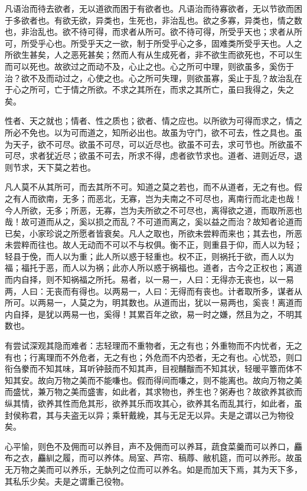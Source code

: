 \documentclass[]{article}
\begin{document}
凡语治而待去欲者，无以道欲而困于有欲者也。凡语治而待寡欲者，无以节欲而困于多欲者也。有欲无欲，异类也，生死也，非治乱也。欲之多寡，异类也，情之数也，非治乱也。欲不待可得，而求者从所可。欲不待可得，所受乎天也；求者从所可，所受乎心也。所受乎天之一欲，制于所受乎心之多，固难类所受乎天也。人之所欲生甚矣，人之恶死甚矣；然而人有从生成死者，非不欲生而欲死也，不可以生而可以死也。故欲过之而动不及，心止之也。心之所可中理，则欲虽多，奚伤于治？欲不及而动过之，心使之也。心之所可失理，则欲虽寡，奚止于乱？故治乱在于心之所可，亡于情之所欲。不求之其所在，而求之其所亡，虽曰我得之，失之矣。

性者、天之就也；情者、性之质也；欲者、情之应也。以所欲为可得而求之，情之所必不免也。以为可而道之，知所必出也。故虽为守门，欲不可去，性之具也。虽为天子，欲不可尽。欲虽不可尽，可以近尽也。欲虽不可去，求可节也。所欲虽不可尽，求者犹近尽；欲虽不可去，所求不得，虑者欲节求也。道者、进则近尽，退则节求，天下莫之若也。

凡人莫不从其所可，而去其所不可。知道之莫之若也，而不从道者，无之有也。假之有人而欲南，无多；而恶北，无寡，岂为夫南之不可尽也，离南行而北走也哉！今人所欲，无多；所恶，无寡，岂为夫所欲之不可尽也，离得欲之道，而取所恶也哉！故可道而从之，奚以损之而乱？不可道而离之，奚以益之而治？故知者论道而已矣，小家珍说之所愿者皆衰矣。凡人之取也，所欲未尝粹而来也；其去也，所恶未尝粹而往也。故人无动而不可以不与权俱。衡不正，则重县于仰，而人以为轻；轻县于俛，而人以为重；此人所以惑于轻重也。权不正，则祸托于欲，而人以为福；福托于恶，而人以为祸；此亦人所以惑于祸福也。道者，古今之正权也；离道而内自择，则不知祸福之所托。易者，以一易一，人曰：无得亦无丧也，以一易两，人曰：无丧而有得也。以两易一，人曰：无得而有丧也。计者取所多，谋者从所可。以两易一，人莫之为，明其数也。从道而出，犹以一易两也，奚丧！离道而内自择，是犹以两易一也，奚得！其累百年之欲，易一时之嫌，然且为之，不明其数也。

有尝试深观其隐而难者：志轻理而不重物者，无之有也；外重物而不内忧者，无之有也；行离理而不外危者，无之有也；外危而不内恐者，无之有也。心忧恐，则口衔刍豢而不知其味，耳听钟鼓而不知其声，目视黼黻而不知其状，轻暖平簟而体不知其安。故向万物之美而不能嗛也。假而得间而嗛之，则不能离也。故向万物之美而盛忧，兼万物之美而盛害，如此者，其求物也，养生也？粥寿也？故欲养其欲而纵其情，欲养其性而危其形，欲养其乐而攻其心，欲养其名而乱其行，如此者，虽封侯称君，其与夫盗无以异；乘轩戴絻，其与无足无以异。夫是之谓以己为物役矣。

心平愉，则色不及佣而可以养目，声不及佣而可以养耳，蔬食菜羹而可以养口，麤布之衣，麤紃之履，而可以养体。局室、芦帘、稿蓐、敝机筵，而可以养形。故虽无万物之美而可以养乐，无埶列之位而可以养名。如是而加天下焉，其为天下多，其私乐少矣。夫是之谓重己役物。
\end{document}
